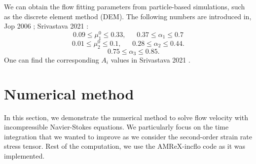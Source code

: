 We can obtain the flow fitting parameters from particle-based simulations, such as the discrete element method (DEM). The following numbers are introduced in, Jop 2006 \cite{jop_constitutive_2006}; Srivastava 2021 \cite{srivastava_viscometric_2021}:
    \[
    0.09 \leq \mu_1^0 \leq 0.33, 
    \ \ \ \ \ \ \ 
    0.37 \leq \alpha_1 \leq 0.7
    \]
        \[
    0.01 \leq \mu_2^0 \leq 0.1, 
    \ \ \ \ \ \ \ 
    0.28 \leq \alpha_2 \leq 0.44.
    \]
            \[
    \ \ \ \ \ \ \ 
    0.75 \leq \alpha_3 \leq 0.85.
    \]
     One can find the corresponding $A_i$ values in Srivastava 2021 \cite{srivastava_viscometric_2021}.

\section{Numerical method}
In this section, we demonstrate the numerical method to solve flow velocity with incompressible Navier-Stokes equations. We particularly focus on the time integration that we wanted to improve as we consider the second-order strain rate stress tensor.
Rest of the computation, we use the AMReX-incflo code as it was implemented. 
